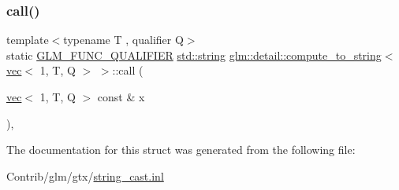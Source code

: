 \subsubsection{\texorpdfstring{call()}{call()}}
{\footnotesize\ttfamily template$<$typename T , qualifier Q$>$ \\
static \mbox{\hyperlink{setup_8hpp_a33fdea6f91c5f834105f7415e2a64407}{G\+L\+M\+\_\+\+F\+U\+N\+C\+\_\+\+Q\+U\+A\+L\+I\+F\+I\+ER}} \mbox{\hyperlink{_s_d_l__opengl__glext_8h_ae84541b4f3d8e1ea24ec0f466a8c568b}{std\+::string}} \mbox{\hyperlink{structglm_1_1detail_1_1compute__to__string}{glm\+::detail\+::compute\+\_\+to\+\_\+string}}$<$ \mbox{\hyperlink{structglm_1_1vec}{vec}}$<$ 1, T, Q $>$ $>$\+::call (\begin{DoxyParamCaption}\item[{\mbox{\hyperlink{structglm_1_1vec}{vec}}$<$ 1, T, Q $>$ const \&}]{x }\end{DoxyParamCaption})\hspace{0.3cm}{\ttfamily [inline]}, {\ttfamily [static]}}



The documentation for this struct was generated from the following file\+:\begin{DoxyCompactItemize}
\item 
Contrib/glm/gtx/\mbox{\hyperlink{string__cast_8inl}{string\+\_\+cast.\+inl}}\end{DoxyCompactItemize}
